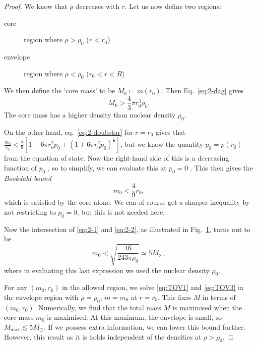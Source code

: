 \begin{proof}
  We know that $\rho$ decreases with $r$.
  Let us now define two regions:
  \begin{description}
    \item[core] region where $\rho > \rho_0$ ($r < r_0$)
    \item[envelope] region where $\rho < \rho_0$ ($r_0 < r < R$)
  \end{description}
  We then define the `core mass' to be $M_0 \coloneqq m(r_0)$.
  Then Eq.~\eqref{eq:2-dag} gives 
  \begin{equation}
    \label{eq:2-1}
    M_0 > \frac{4}{3} \pi r^3_0 \rho_0.
  \end{equation}
  The core mass has a higher density than nuclear density $\rho_0$.

  On the other hand, eq.~\eqref{eq:2-doubstar} for $r = r_0$ gives that $\frac{m_0}{r_0} < \frac{2}{9}\left[ 1 -6 \pi r_0^2 p_0 + (1 + 6 \pi r_0^2 p_0)^{\frac{1}{2}} \right]$, but we know the quantity $p_0 = p(r_0)$  from the equation of state.
  Now the right-hand side of this is a decreasing function of $p_0$ , so to simplify, we can evaluate this at $p_0 = 0$ . This then gives the \emph{Bookdahl bound}
  \begin{equation}
    \label{eq:2-2}
    m_0 < \frac{4}{9} r_0,
  \end{equation}
  which is satisfied by the core alone.
  We can of course get a sharper inequality by not restricting to $p_0 = 0$, but this is not needed here.
  \begin{figure}[tbhp]
    \centering
    \def\svgwidth{0.4\columnwidth}
    
    \caption{}
    \label{fig:l2f2}
  \end{figure}
  Now the intersection of \eqref{eq:2-1} and \eqref{eq:2-2}, as illustrated in Fig.~\ref{fig:l2f2}, turns out to be
  \begin{equation}
    m_0 < \sqrt{\frac{16}{243 \pi \rho_0}} \simeq 5 M_\odot,
  \end{equation}
  where in evaluating this last expression we used the nuclear density $\rho_0$.

  For any $(m_0, r_0)$ in the allowed region, we solve \eqref{eq:TOV1} and \eqref{eq:TOV3} in the envelope region with $\rho = \rho_0$, $m = m_0$ at $r = r_0$. This fixes $M$ in terms of $(m_0, r_0)$.
  Numerically, we find that the total mass $M$ is maximised when the core mass $m_0$ is maximised.
  At this maximum, the envelope is small, so $M_{\text{max}} \lesssim 5 M_\odot$.
  If we possess extra information, we can lower this bound further. However, this result as it is holds independent of the densities at $\rho > \rho_0$.
\end{proof}

